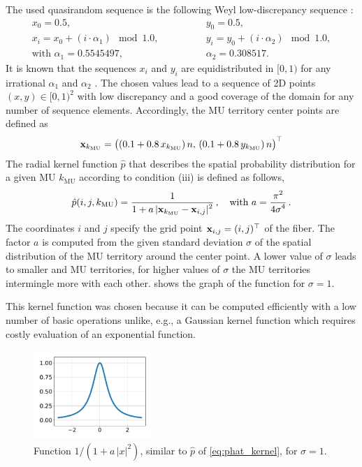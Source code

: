 The used quasirandom sequence is the following Weyl low-discrepancy sequence \cite{Weyl1916}:
\begin{equation}\label{eq:weyl}
  \begin{array}{lll}
    x_0 = 0.5, \qquad &y_0 = 0.5,\\[4mm]
    x_{i} = x_0+(i\cdot \alpha_1) \mod \num{1.0}, \qquad\qquad 
    &y_{i} = y_0+(i\cdot \alpha_2) \mod \num{1.0},\\[4mm]
    \text{with }\alpha_1 = \num{0.5545497}, \qquad &\alpha_2 = \num{0.308517}.
  \end{array}
\end{equation}
It is known that the sequences $x_i$ and $y_i$ are equidistributed in $[0,1)$ for any irrational $\alpha_1$ and $\alpha_2$ \cite{Weyl1916}. The chosen values lead to a sequence of 2D points $(x,y)\in $$[0,1)^2$ with low discrepancy and a good coverage of the domain for any number of sequence elements. Accordingly, the MU territory center points are defined as 
%
\begin{align*}
  \textbf{x}_{k_\text{MU}} = \big((0.1 + 0.8\,x_{k_\text{MU}})\,n,\, (0.1 + 0.8\,y_{k_\text{MU}})\,n\big)^\top
\end{align*}
%
The radial kernel function $\hat{p}$ that describes the spatial probability distribution for a given MU $k_\text{MU}$ according to condition (iii) is defined as follows,
\begin{align}\label{eq:phat_kernel}
  \hat{p}(i,j,k_\text{MU}) = \displaystyle\frac{\displaystyle{1}}{\displaystyle{1 + a\,\vert\textbf{x}_{k_\text{MU}} - \textbf{x}_{i,j}\vert^2}}\,, \quad \text{with }a = \displaystyle\frac{\displaystyle{\pi^2}}{\displaystyle{4\sigma^4}}\,.
\end{align}
The coordinates $i$ and $j$ specify the grid point $\textbf{x}_{i,j} = (i,j)^\top$ of the fiber. The factor $a$ is computed from the given standard deviation $\sigma$ of the spatial distribution of the MU territory around the center point. A lower value of $\sigma$ leads to smaller and  MU territories, for higher values of $\sigma$ the MU territories intermingle more with each other.
 shows the graph of the function for $\sigma=1$. 

This kernel function was chosen because it can be computed efficiently with a low number of basic operations unlike, e.g., a Gaussian kernel function which requires costly evaluation of an exponential function.

\begin{figure}%
  \centering%
  \includegraphics[width=0.4\textwidth]{images/motor_unit_assignment/phat.pdf}%
  \caption{Function $1/(1+a\,|x|^2)$, similar to $\hat{p}$ of \cref{eq:phat_kernel}, for $\sigma=1$.}%
  \label{fig:mu_phat}%
\end{figure}



